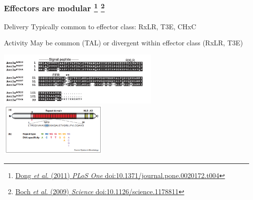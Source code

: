 \begin{frame}
\begin{center}
  \end{center}
\end{frame}

\begin{frame}
  \frametitle{Effectors are modular
  \footnote{\tiny{\href{http://dx.doi.org/10.1371/journal.pone.0020172.t004}{Dong \textit{et al.} (2011) \textit{PLoS One} doi:10.1371/journal.pone.0020172.t004}}}
  \footnote{\tiny{\href{http://dx.doi.org/10.1126/science.1178811}{Boch \textit{et al.} (2009) \textit{Science} doi:10.1126/science.1178811}}}
  }
  \begin{footnotesize}
    \begin{alertblock}{Delivery}
      Typically common to effector class: RxLR, T3E, CHxC
    \end{alertblock}
    \begin{block}{Activity}
      May be common (TAL) or divergent within effector class (RxLR, T3E)
    \end{block}  
  \end{footnotesize}
  \begin{center}
    \includegraphics[width=0.6\textwidth,valign=t]{images/modular_rxlr_dong_et_al_2011}    
    \includegraphics[width=0.4\textwidth,valign=t]{images/modular_tal_scholze_et_al_2011}        
  \end{center}
\end{frame}

